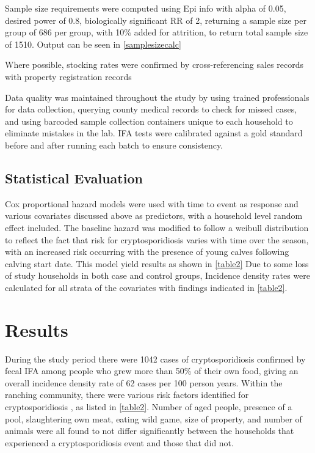 \documentclass[12pt]{article}
\begin{document}
		Sample size requirements were computed using Epi info with alpha of 0.05, desired power of 0.8, biologically significant RR of 2, returning a sample size per group of 686 per group, with 10\% added for attrition, to return total sample size of 1510.
		Output can be seen in \ref{samplesizecalc}

		Where possible, stocking rates were confirmed by cross-referencing sales records with property registration records
		

		Data quality was maintained throughout the study by using trained professionals for data collection, querying county medical records to check for missed cases, and using barcoded sample collection containers unique to each household to eliminate mistakes in the lab.
		IFA tests were calibrated against a gold standard before and after running each batch to ensure consistency.

	\subsection{Statistical Evaluation}
		Cox proportional hazard models were used with time to event as response and various covariates discussed above as predictors, with a household level random effect included.
		The baseline hazard was modified to follow a weibull distribution to reflect the fact that risk for cryptosporidiosis varies with time over the season, with an increased risk occurring with the presence of young calves following calving start date. 
		This model yield results as shown in \ref{table2}
		Due to some loss of study households in both case and control groups, Incidence density rates were calculated for all strata of the covariates with findings indicated in \ref{table2}.



	\section{Results}
		During the study period there were 1042 cases of cryptosporidiosis confirmed by fecal IFA among people who grew more than 50\% of their own food, giving an overall incidence density rate of 62 cases per 100 person years.
		Within the ranching community, there were various risk factors identified for cryptosporidiosis , as listed in \ref{table2}. 
		Number of aged people, presence of a pool, slaughtering own meat, eating wild game, size of property, and number of animals were all found to not differ significantly between the households that experienced a cryptosporidiosis event and those that did not. 
\end{document}
